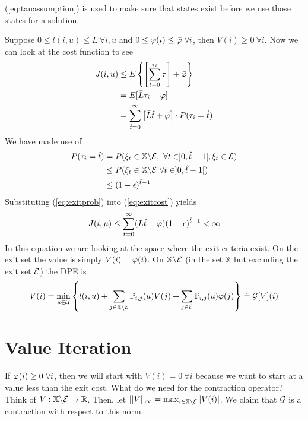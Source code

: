 (\ref{eq:tauassumption}) is used to make sure that states exist before we use those states for a solution.

Suppose $0\leq l(i,u)\leq \bar{L} ~\forall i,u$ and $0\leq \varphi(i) \leq \bar{\varphi} ~\forall i$, then $V(i)\geq0 ~\forall i$. Now we can look at the cost function to see
\begin{align}
\label{eq:exitcost}
J(i,u) &\leq E\left\lbrace \left[\sum_{t=0}^{\tau_i}\tau\right] + \bar{\varphi}\right\rbrace \nonumber \\
&= E[\bar{L}\tau_i+\bar{\varphi}] \nonumber \\
&= \sum_{\hat{t}=0}^\infty\left[\bar{L}\hat{t}+\bar{\varphi}\right]\cdot P(\tau_i=\hat{t})
\end{align}
We have made use of
\begin{align}
\label{eq:exitprob}
P(\tau_i=\hat{t}) &= P(\xi_t\in\mathbb{X}\backslash\mathcal{E}, ~\forall t\in]0,\hat{t}-1[, \xi_t\in\mathcal{E}) \nonumber \\
&\leq P(\xi_t\in\mathbb{X}\backslash\mathcal{E} ~\forall t\in]0,\hat{t}-1[) \nonumber \\
&\leq (1-\epsilon)^{\hat{t}-1}
\end{align}
Substituting (\ref{eq:exitprob}) into (\ref{eq:exitcost}) yields
$$J(i,\mu) \leq \sum_{t=0}^\infty (\bar{L}\hat{t}-\bar{\varphi})(1-\epsilon)^{\hat{t}-1}<\infty$$
In this equation we are looking at the space where the exit criteria exist. On the exit set the value is simply $V(i)=\varphi(i)$. On $\mathbb{X}\backslash\mathcal{E}$ (in the set $\mathbb{X}$ but excluding the exit set $\mathcal{E}$) the DPE is
$$V(i) = \min_{u\in\mathcal{U}}\left\lbrace l(i,u) + \sum_{j\in\mathbb{X}\backslash\mathcal{E}}\mathbb{P}_{i,j}(u)V(j) + \sum_{j\in\mathcal{E}}\mathbb{P}_{i,j}(u)\varphi(j)\right\rbrace \doteq \mathcal{G}[V](i)$$

\section{Value Iteration}
If $\varphi(i)\geq0 ~\forall i$, then we will start with $V(i)=0 ~\forall i$ because we want to start at a value less than the exit cost. What do we need for the contraction operator? Think of $V:\mathbb{X}\backslash\mathcal{E}\to\mathbb{R}$. Then, let $||V||_\infty = \max_{i\in\mathbb{X}\backslash\mathcal{E}}|V(i)|$. We claim that $\mathcal{G}$ is a contraction with respect to this norm.

